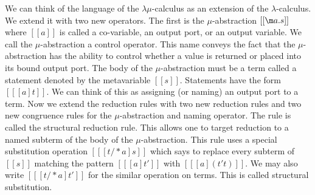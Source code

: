 We can think of the language of the $\lambda\mu$-calculus as an
extension of the $\lambda$-calculus.  We extend it with two new
operators.  The first is the $\mu$-abstraction $[[\m a.s]]$ where
$[[a]]$ is called a co-variable, an output port, or an output
variable.  We call the $\mu$-abstraction a control operator.  This
name conveys the fact that the $\mu$-abstraction has the ability to
control whether a value is returned or placed into its bound output
port.  The body of the $\mu$-abstraction must be a term called a
statement denoted by the metavariable $[[s]]$.  Statements have the
form $[[ [a]t]]$.  We can think of this as assigning (or naming) an
output port to a term.  Now we extend the reduction rules with two new
reduction rules and two new congruence rules for the $\mu$-abstraction
and naming operator. The  rule is called the
structural reduction rule.  This allows one to target reduction to a
named subterm of the body of the $\mu$-abstraction.  This rule uses a
special substitution operation $[[ [t /* a]s]]$ which says to replace
every subterm of $[[s]]$ matching the pattern $[[ [a]t']]$ with 
$[[ [a](t' t)]]$.  We may also write $[[ [t /* a]t']]$ for the similar
operation on terms. This is called structural substitution.

